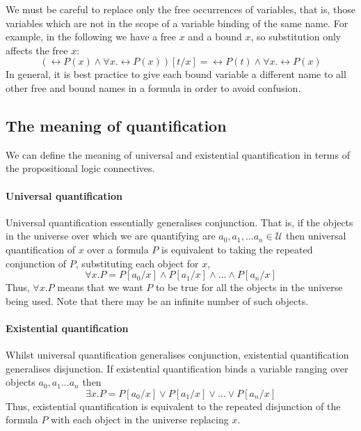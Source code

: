 We must be careful to replace only the free
occurrences of variables, that is, those variables which are not in
the scope of a variable binding of the same name. For example, in the
following we have a free $x$ and a bound $x$, so substitution only
affects the free $x$:
%
\begin{equation*}
(\rel{P}(x) \wedge \forall x . \rel{P}(x))[t/x]
= \rel{P}(t) \wedge \forall x . \rel{P}(x)
\end{equation*}
%
In general, it is best practice to give each bound variable a different name
to all other free and bound names in a formula in order to avoid
confusion.

\subsection{The meaning of quantification}
\label{subsec:quantifier-meaning}

We can define the meaning of universal and existential quantification
in terms of the propositional logic connectives.

\paragraph{Universal quantification}

Universal quantification essentially generalises conjunction.  That
is, if the objects in the universe over which we are quantifying are
$a_0, a_1, \ldots a_n \in \mathcal{U}$ then universal quantification
of $x$ over a formula $P$ is equivalent to taking the repeated
conjunction of $P$, substituting each object for $x$, \ie{}
%
\begin{equation}
\forall x . P = P[a_0/x] \wedge P[a_1/x] \wedge
\ldots \wedge P[a_{n}/x]
\label{eq:forall-meaning}
\end{equation}
%
Thus, $\forall x . P$ means that we want $P$ to be true for
all the objects in the universe being used.
Note that there may be an infinite number of such objects.

\paragraph{Existential quantification}

Whilst universal quantification generalises conjunction,
existential quantification generalises disjunction.
If existential quantification binds a variable ranging
over objects $a_0, a_1 ... a_n$ then
%
\begin{equation}
\exists x . P = P[a_0/x] \vee P[a_1/x] \vee
\ldots \vee P[a_{n}/x]
\label{eq:exists-meaning}
\end{equation}
%
Thus, existential quantification is equivalent to the repeated
disjunction of the formula $P$ with each object in the universe
replacing $x$.



